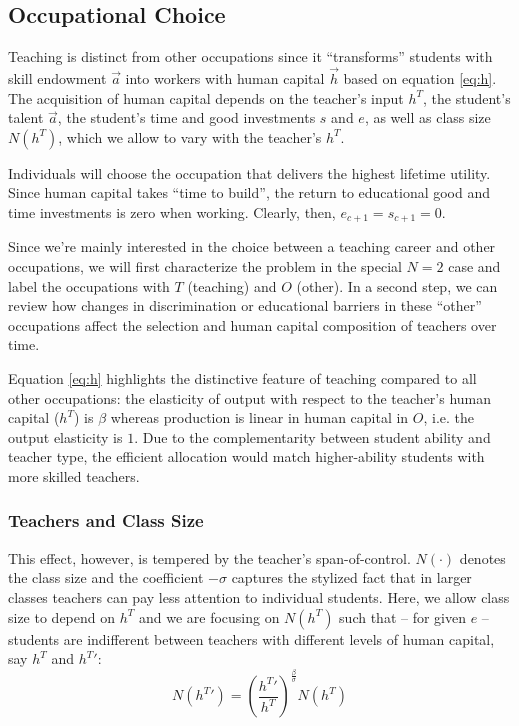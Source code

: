 \documentclass[onehalfspacing,11pt]{article}
\begin{document}
\subsection{Occupational Choice}
Teaching is distinct from other occupations since it ``transforms'' students with skill endowment $\vec{a}$ into workers with human capital $\vec{h}$ based on equation \eqref{eq:h}. The acquisition of human capital depends on the teacher's input $h^T$, the student's talent $\vec{a}$, the student's time and good investments $s$ and $e$, as well as class size $N(h^T)$, which we allow to vary with the teacher's $h^T$.

Individuals will choose the occupation that delivers the highest lifetime utility. Since human capital takes ``time to build'', the return to educational good and time investments is zero when working. Clearly, then, $e_{c+1} = s_{c+1} = 0$.

Since we're mainly interested in the choice between a teaching career and other occupations, we will first characterize the problem in the special $N=2$ case and label the occupations with $T$ (teaching) and $O$ (other). In a second step, we can review how changes in discrimination or educational barriers in these ``other'' occupations affect the selection and human capital composition of teachers over time.

Equation \eqref{eq:h} highlights the distinctive feature of teaching compared to all other occupations: the elasticity of output with respect to the teacher's human capital ($h^T$) is $\beta$ whereas production is linear in human capital in $O$, i.e. the output elasticity is $1$. Due to the complementarity between student ability and teacher type, the efficient allocation would match higher-ability students with more skilled teachers.
\subsubsection{Teachers and Class Size}
 This effect, however, is tempered by the teacher's span-of-control. $N(\cdot)$ denotes the class size and the coefficient $-\sigma$ captures the stylized fact that in larger classes teachers can pay less attention to individual students. Here, we allow class size to depend on $h^T$ and we are focusing on $N(h^T)$ such that -- for given $e$ -- students are indifferent between teachers with different levels of human capital, say $h^T$ and ${h^T}'$:
 \begin{equation}
\label{ }
N({h^T}') = \left(\frac{{h^T}'}{{h^T}}\right)^{\frac{\beta}{\sigma}} N({h^T})
\end{equation}
\end{document}
